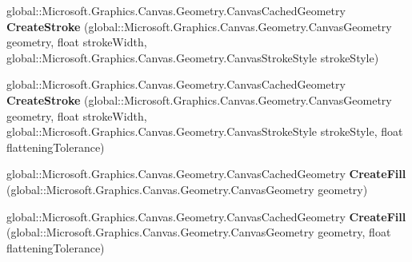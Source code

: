 \begin{DoxyCompactItemize}
\mbox{\label{interface_microsoft_1_1_graphics_1_1_canvas_1_1_geometry_1_1_i_canvas_cached_geometry_statics_a468aa4e2b6369a93bc595faa4775ecd3}} 
global\+::\+Microsoft.\+Graphics.\+Canvas.\+Geometry.\+Canvas\+Cached\+Geometry {\bfseries Create\+Stroke} (global\+::\+Microsoft.\+Graphics.\+Canvas.\+Geometry.\+Canvas\+Geometry geometry, float stroke\+Width, global\+::\+Microsoft.\+Graphics.\+Canvas.\+Geometry.\+Canvas\+Stroke\+Style stroke\+Style)
\item 
\mbox{\label{interface_microsoft_1_1_graphics_1_1_canvas_1_1_geometry_1_1_i_canvas_cached_geometry_statics_af2be06fab26ecb06f7f43abc6c9f7a87}} 
global\+::\+Microsoft.\+Graphics.\+Canvas.\+Geometry.\+Canvas\+Cached\+Geometry {\bfseries Create\+Stroke} (global\+::\+Microsoft.\+Graphics.\+Canvas.\+Geometry.\+Canvas\+Geometry geometry, float stroke\+Width, global\+::\+Microsoft.\+Graphics.\+Canvas.\+Geometry.\+Canvas\+Stroke\+Style stroke\+Style, float flattening\+Tolerance)
\item 
\mbox{\label{interface_microsoft_1_1_graphics_1_1_canvas_1_1_geometry_1_1_i_canvas_cached_geometry_statics_a16df585fb0ca36d40ef89871533acc2a}} 
global\+::\+Microsoft.\+Graphics.\+Canvas.\+Geometry.\+Canvas\+Cached\+Geometry {\bfseries Create\+Fill} (global\+::\+Microsoft.\+Graphics.\+Canvas.\+Geometry.\+Canvas\+Geometry geometry)
\item 
\mbox{\label{interface_microsoft_1_1_graphics_1_1_canvas_1_1_geometry_1_1_i_canvas_cached_geometry_statics_af902923a82387d578dcc6b4a2ac54662}} 
global\+::\+Microsoft.\+Graphics.\+Canvas.\+Geometry.\+Canvas\+Cached\+Geometry {\bfseries Create\+Fill} (global\+::\+Microsoft.\+Graphics.\+Canvas.\+Geometry.\+Canvas\+Geometry geometry, float flattening\+Tolerance)
\item 
\mbox{\label{interface_microsoft_1_1_graphics_1_1_canvas_1_1_geometry_1_1_i_canvas_cached_geometry_statics_a979cdeceea3a10a40d02ca0440985082}} 

\end{DoxyCompactItemize}
